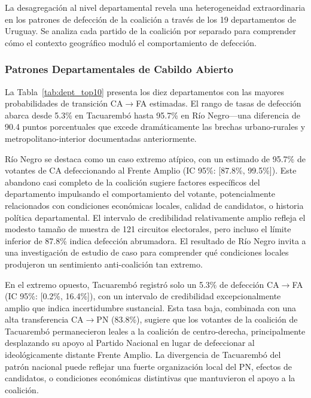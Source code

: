 La desagregación al nivel departamental revela una heterogeneidad extraordinaria en los patrones de defección de la coalición a través de los 19 departamentos de Uruguay. Se analiza cada partido de la coalición por separado para comprender cómo el contexto geográfico moduló el comportamiento de defección.

\subsubsection{Patrones Departamentales de Cabildo Abierto}

La Tabla~\ref{tab:dept_top10} presenta los diez departamentos con las mayores probabilidades de transición CA$\to$FA estimadas. El rango de tasas de defección abarca desde 5.3\% en Tacuarembó hasta 95.7\% en Río Negro---una diferencia de 90.4 puntos porcentuales que excede dramáticamente las brechas urbano-rurales y metropolitano-interior documentadas anteriormente.



Río Negro se destaca como un caso extremo atípico, con un estimado de 95.7\% de votantes de CA defeccionando al Frente Amplio (IC 95\%: [87.8\%, 99.5\%]). Este abandono casi completo de la coalición sugiere factores específicos del departamento impulsando el comportamiento del votante, potencialmente relacionados con condiciones económicas locales, calidad de candidatos, o historia política departamental. El intervalo de credibilidad relativamente amplio refleja el modesto tamaño de muestra de 121 circuitos electorales, pero incluso el límite inferior de 87.8\% indica defección abrumadora. El resultado de Río Negro invita a una investigación de estudio de caso para comprender qué condiciones locales produjeron un sentimiento anti-coalición tan extremo.

En el extremo opuesto, Tacuarembó registró solo un 5.3\% de defección CA$\to$FA (IC 95\%: [0.2\%, 16.4\%]), con un intervalo de credibilidad excepcionalmente amplio que indica incertidumbre sustancial. Esta tasa baja, combinada con una alta transferencia CA$\to$PN (83.8\%), sugiere que los votantes de la coalición de Tacuarembó permanecieron leales a la coalición de centro-derecha, principalmente desplazando su apoyo al Partido Nacional en lugar de defeccionar al ideológicamente distante Frente Amplio. La divergencia de Tacuarembó del patrón nacional puede reflejar una fuerte organización local del PN, efectos de candidatos, o condiciones económicas distintivas que mantuvieron el apoyo a la coalición.


